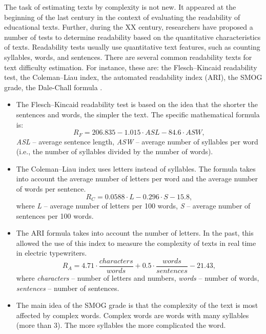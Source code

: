 \documentclass[runningheads]{llncs}
\begin{document}
The task of estimating texts by complexity is not new. It appeared at the beginning of the last century in the context of evaluating the readability of educational texts. Further, during the XX century, researchers have proposed a number of tests to determine readability based on the quantitative characteristics of texts. Readability tests usually use quantitative text features, such as counting syllables, words, and sentences. There are several common readability texts for text difficulty estimation. For instance, these are: the Flesch–Kincaid readability test, the Coleman–Liau index, the automated readability index (ARI), the SMOG grade, the Dale-Chall formula \cite{Crossley,Didegan}. 

\begin{itemize}
    \item The Flesch–Kincaid readability test is based on the idea that the shorter the sentences and words, the simpler the text. The specific mathematical formula is: 
    \begin{equation}
      \textit{R}_\textit{F} = 206.835 - 1.015  \cdot \textit{ASL} - 84.6  \cdot \textit{ASW},
    \end{equation}
    \textit{ASL} -- average sentence length,
    \textit{ASW} -- average number of syllables per word (i.e., the number of syllables divided by the number of words).
    \item The Coleman–Liau index uses letters instead of syllables. The formula takes into account the average number of letters per word and the average number of words per sentence.
     \begin{equation}
      \textit{R}_\textit{C} = 0.0588 \cdot L - 0.296 \cdot S - 15.8,
    \end{equation}
    where \textit{L} -- average number of letters per 100 words,
    \textit{S} -- average number of sentences per 100 words.
    \item The ARI formula takes into account the number of letters. In the past, this allowed the use of this index to measure the complexity of texts in real time in electric typewriters.
     \begin{equation}
      \textit{R}_\textit{A} = 4.71\cdot \frac{characters}{words} + 0.5\cdot \frac{words}{sentences} - 21.43,
    \end{equation}
    where \textit{characters} -- number of letters and numbers,
    \textit{words} -- number of words,
    \textit{sentences} -- number of sentences.
    \item The main idea of the SMOG grade is that the complexity of the text is most affected by complex words. Complex words are words with many syllables (more than 3). The more syllables the more complicated the word.

\end{itemize}
\end{document}
